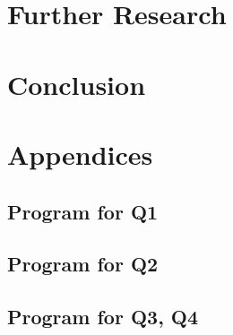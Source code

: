 \documentclass[12pt]{article}
\begin{document}
\section{Further Research}

\section{Conclusion}
\newpage
\newpage
\listoffigures
\listoftables


\newpage
\section*{Appendices}
\subsection*{Program for Q1}


\subsection*{Program for Q2}



\subsection*{Program for Q3, Q4}

\end{document}
